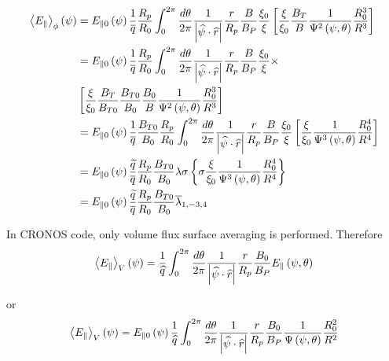 \documentclass[12pt,a4paper]{article}
\begin{document}
\begin{align}
\left\langle E_{\Vert }\right\rangle _{\phi }\left( \psi \right) & =E_{\Vert
0}\left( \psi \right) \frac{1}{\overline{q}}\frac{R_{p}}{R_{0}}%
\int_{0}^{2\pi }\frac{d\theta }{2\pi }\frac{1}{\left\vert \widehat{\psi }%
\cdot \widehat{r}\right\vert }\frac{r}{R_{p}}\frac{B}{B_{P}}\frac{\xi _{0}}{%
\xi }\left[ \frac{\xi }{\xi _{0}}\frac{B_{T}}{B}\frac{1}{\Psi ^{2}\left(
\psi ,\theta \right) }\frac{R_{0}^{3}}{R^{3}}\right]   \nonumber \\
& =E_{\Vert 0}\left( \psi \right) \frac{1}{\overline{q}}\frac{R_{p}}{R_{0}}%
\int_{0}^{2\pi }\frac{d\theta }{2\pi }\frac{1}{\left\vert \widehat{\psi }%
\cdot \widehat{r}\right\vert }\frac{r}{R_{p}}\frac{B}{B_{P}}\frac{\xi _{0}}{%
\xi }\times   \nonumber \\
& \left[ \frac{\xi }{\xi _{0}}\frac{B_{T}}{B_{T0}}\frac{B_{T0}}{B_{0}}\frac{%
B_{0}}{B}\frac{1}{\Psi ^{2}\left( \psi ,\theta \right) }\frac{R_{0}^{3}}{%
R^{3}}\right]   \nonumber \\
& =E_{\Vert 0}\left( \psi \right) \frac{1}{\overline{q}}\frac{B_{T0}}{B_{0}}%
\frac{R_{p}}{R_{0}}\int_{0}^{2\pi }\frac{d\theta }{2\pi }\frac{1}{\left\vert 
\widehat{\psi }\cdot \widehat{r}\right\vert }\frac{r}{R_{p}}\frac{B}{B_{P}}%
\frac{\xi _{0}}{\xi }\left[ \frac{\xi }{\xi _{0}}\frac{1}{\Psi ^{3}\left(
\psi ,\theta \right) }\frac{R_{0}^{4}}{R^{4}}\right]   \nonumber \\
& =E_{\Vert 0}\left( \psi \right) \frac{\widetilde{q}}{\overline{q}}\frac{%
R_{p}}{R_{0}}\frac{B_{T0}}{B_{0}}\lambda \sigma \left\{ \sigma \frac{\xi }{%
\xi _{0}}\frac{1}{\Psi ^{3}\left( \psi ,\theta \right) }\frac{R_{0}^{4}}{%
R^{4}}\right\}   \nonumber \\
& =E_{\Vert 0}\left( \psi \right) \frac{\widetilde{q}}{\overline{q}}\frac{%
R_{p}}{R_{0}}\frac{B_{T0}}{B_{0}}\overline{\lambda }_{1,-3,4}
\end{align}

In CRONOS code, only volume flux surface averaging is performed. Therefore%
\begin{equation}
\left\langle E_{\Vert }\right\rangle _{V}\left( \psi \right) =\frac{1}{%
\widehat{q}}\int_{0}^{2\pi }\frac{d\theta }{2\pi }\frac{1}{\left\vert 
\widehat{\psi }\cdot \widehat{r}\right\vert }\frac{r}{R_{p}}\frac{B_{0}}{%
B_{P}}E_{\Vert }\left( \psi ,\theta \right) 
\end{equation}

or%
\begin{equation}
\left\langle E_{\Vert }\right\rangle _{V}\left( \psi \right) =E_{\Vert
0}\left( \psi \right) \frac{1}{\widehat{q}}\int_{0}^{2\pi }\frac{d\theta }{%
2\pi }\frac{1}{\left\vert \widehat{\psi }\cdot \widehat{r}\right\vert }\frac{%
r}{R_{p}}\frac{B_{0}}{B_{P}}\frac{1}{\Psi \left( \psi ,\theta \right) }\frac{%
R_{0}^{2}}{R^{2}}
\end{equation}
\end{document}
